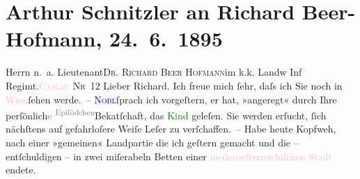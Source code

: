 

               \section[Arthur Schnitzler an Richard Beer-Hofmann, 24. 6. 1895]{ Arthur Schnitzler an Richard Beer-Hofmann,
               24. 6. 1895}\nopagebreak{}\rehead{ }\normalsize\beginnumbering{} \toendnotes[C]{\smallbreak\pagebreak[2]} 
\toendnotes[C]{\smallbreak}\pstart{}{\pb}Herrn n. a. Lieutenant\pend{}\pstart{}\textsc{Dr. Richard Beer Hofmann}\pend{}\pstart{}im k.k. Landw Inf Regimt.\pend{}\pstart{}\textsc{\textcolor{pink}{Caslau}{}\ledrightnote{\textcolor{pink}{Caslau}} Nr 12}\pend{}{\bigskip}\pstart
           \noindent{}{\pb}Lieber Richard. Ich freue mich ſehr, daſs ich Sie noch in \textcolor{pink}{Wien}{}\ledrightnote{\textcolor{pink}{Wien}}{ }ſehen werde. – \textcolor{blue}{\textsc{Nobl}}{}\ledrightnote{\textcolor{blue}{Gabor Nobl}}{ }ſprach ich vorgeſtern, er hat, »angeregt« durch Ihr\introOben{}e\introOben{}
                  perſönlich\textcolor{gray}{e}{ }\substVorne{}\textsuperscript{\textcolor{gray}{Epiſödchen}}{\allowbreak}\substDazwischen{}Beka{\geminationn}tſchaft\substHinten{}, das \textcolor{green}{Kind}{}\ledrightnote{\textcolor{green}{Das Kind}} geleſen. Sie werden erſucht,
               ſich nächſtens auf {\pb}gefahrloſere Weiſe Leſer zu
               verſchaffen. – Habe heute Kopfweh, nach einer »gemeinen« Landpartie die ich geſtern gemacht und die – entſchuldigen – in
               zwei miſerabeln Betten einer \textcolor{pink}{niederoeſterreichiſchen Stadt}{} endete.\pend
